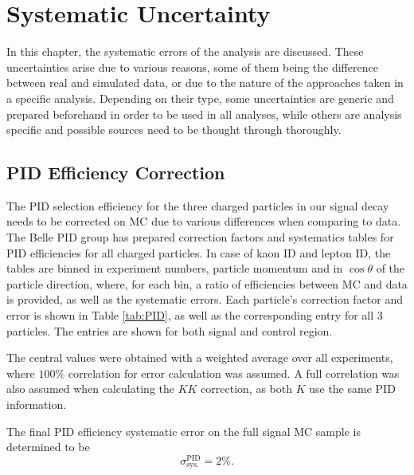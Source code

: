 \chapter{Systematic Uncertainty}\label{sec:systematic-uncertainty}
In this chapter, the systematic errors of the analysis are discussed. These uncertainties arise due to various reasons, some of them being the difference between real and simulated data, or due to the nature of the approaches taken in a specific analysis. Depending on their type, some uncertainties are generic and prepared beforehand in order to be used in all analyses, while others are analysis specific and possible sources need to be thought through thoroughly. 

\section{PID Efficiency Correction}\label{sec:pid-efficiency-correction}

The PID selection efficiency for the three charged particles in our signal decay needs to be corrected on MC due to various differences when comparing to data. The Belle PID group has prepared correction factors and systematics tables for PID efficiencies for all charged particles. In case of kaon ID and lepton ID, the tables are binned in experiment numbers, particle momentum and in $\cos\theta$ of the particle direction, where, for each bin, a ratio of efficiencies between MC and data is provided, as well as the systematic errors. Each particle's correction factor and error is shown in Table \ref{tab:PID}, as well as the corresponding entry for all 3 particles. The entries are shown for both signal and control region.

The central values were obtained with a weighted average over all experiments, where $100\%$ correlation for error calculation was assumed. A full correlation was also assumed when calculating the $KK$ correction, as both $K$ use the same PID information.

The final PID efficiency systematic error on the full signal MC sample is determined to be
\begin{equation}
\sigma_{\mathrm{sys.}}^{\mathrm{PID}} = 2\%.
\end{equation}

